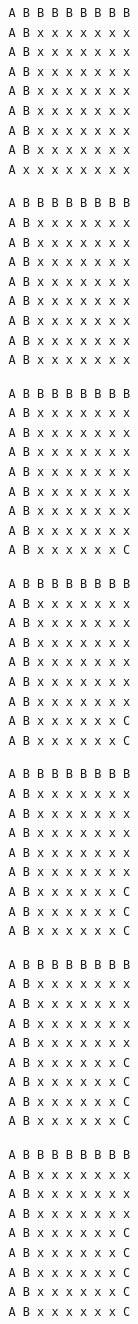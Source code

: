 { \begin{verbatim}
         A B B B B B B B B
         A B x x x x x x x
         A B x x x x x x x
         A B x x x x x x x
         A B x x x x x x x
         A B x x x x x x x
         A B x x x x x x x
         A B x x x x x x x
         A x x x x x x x x
\end{verbatim} }

{ \begin{verbatim}
         A B B B B B B B B
         A B x x x x x x x
         A B x x x x x x x
         A B x x x x x x x
         A B x x x x x x x
         A B x x x x x x x
         A B x x x x x x x
         A B x x x x x x x
         A B x x x x x x x
\end{verbatim} }

{ \begin{verbatim}
         A B B B B B B B B
         A B x x x x x x x
         A B x x x x x x x
         A B x x x x x x x
         A B x x x x x x x
         A B x x x x x x x
         A B x x x x x x x
         A B x x x x x x x
         A B x x x x x x C
\end{verbatim} }

{ \begin{verbatim}
         A B B B B B B B B
         A B x x x x x x x
         A B x x x x x x x
         A B x x x x x x x
         A B x x x x x x x
         A B x x x x x x x
         A B x x x x x x x
         A B x x x x x x C
         A B x x x x x x C
\end{verbatim} }

{ \begin{verbatim}
         A B B B B B B B B
         A B x x x x x x x
         A B x x x x x x x
         A B x x x x x x x
         A B x x x x x x x
         A B x x x x x x x
         A B x x x x x x C
         A B x x x x x x C
         A B x x x x x x C
\end{verbatim} }

{ \begin{verbatim}
         A B B B B B B B B
         A B x x x x x x x
         A B x x x x x x x
         A B x x x x x x x
         A B x x x x x x x
         A B x x x x x x C
         A B x x x x x x C
         A B x x x x x x C
         A B x x x x x x C
\end{verbatim} }

{ \begin{verbatim}
         A B B B B B B B B
         A B x x x x x x x
         A B x x x x x x x
         A B x x x x x x x
         A B x x x x x x C
         A B x x x x x x C
         A B x x x x x x C
         A B x x x x x x C
         A B x x x x x x C
\end{verbatim} }

